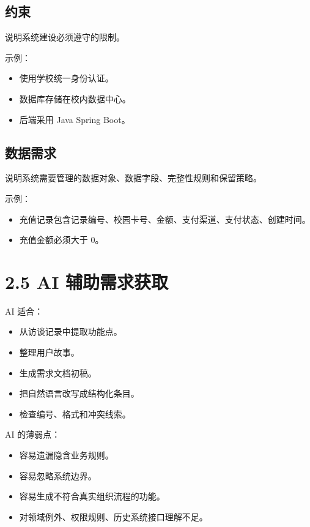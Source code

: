 \documentclass[UTF8,zihao=-4]{ctexart}
\begin{document}
\subsection{约束}

说明系统建设必须遵守的限制。

示例：

\begin{itemize}
\item 使用学校统一身份认证。
\item 数据库存储在校内数据中心。
\item 后端采用 Java Spring Boot。
\end{itemize}

\subsection{数据需求}

说明系统需要管理的数据对象、数据字段、完整性规则和保留策略。

示例：

\begin{itemize}
\item 充值记录包含记录编号、校园卡号、金额、支付渠道、支付状态、创建时间。
\item 充值金额必须大于 0。
\end{itemize}

\section{2.5 AI 辅助需求获取}

AI 适合：

\begin{itemize}
\item 从访谈记录中提取功能点。
\item 整理用户故事。
\item 生成需求文档初稿。
\item 把自然语言改写成结构化条目。
\item 检查编号、格式和冲突线索。
\end{itemize}

AI 的薄弱点：

\begin{itemize}
\item 容易遗漏隐含业务规则。
\item 容易忽略系统边界。
\item 容易生成不符合真实组织流程的功能。
\item 对领域例外、权限规则、历史系统接口理解不足。
\end{itemize}
\end{document}
